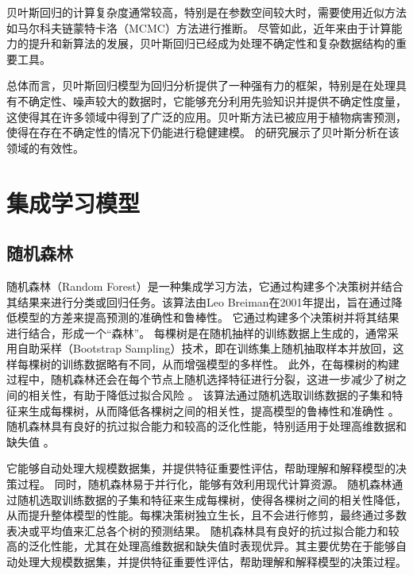 \documentclass[AutoFakeBold]{LZUThesis-PgD&PhD}
\begin{document}
	
	贝叶斯回归的计算复杂度通常较高，特别是在参数空间较大时，需要使用近似方法如马尔科夫链蒙特卡洛（MCMC）方法进行推断。
	尽管如此，近年来由于计算能力的提升和新算法的发展，贝叶斯回归已经成为处理不确定性和复杂数据结构的重要工具。
	
	总体而言，贝叶斯回归模型为回归分析提供了一种强有力的框架，特别是在处理具有不确定性、噪声较大的数据时，它能够充分利用先验知识并提供不确定性度量，这使得其在许多领域中得到了广泛的应用。贝叶斯方法已被应用于植物病害预测，使得在存在不确定性的情况下仍能进行稳健建模。\citet{yuen2002bayesian} 的研究展示了贝叶斯分析在该领域的有效性。
	
	\section{集成学习模型}
	
	\subsection{随机森林}
	
	随机森林（Random Forest）是一种集成学习方法，它通过构建多个决策树并结合其结果来进行分类或回归任务。该算法由Leo Breiman在2001年提出，旨在通过降低模型的方差来提高预测的准确性和鲁棒性。
	它通过构建多个决策树并将其结果进行结合，形成一个“森林”。
	每棵树是在随机抽样的训练数据上生成的，通常采用自助采样（Bootstrap Sampling）技术，即在训练集上随机抽取样本并放回，这样每棵树的训练数据略有不同，从而增强模型的多样性。
	此外，在每棵树的构建过程中，随机森林还会在每个节点上随机选择特征进行分裂，这进一步减少了树之间的相关性，有助于降低过拟合风险 \cite{breiman2001random}。
	该算法通过随机选取训练数据的子集和特征来生成每棵树，从而降低各棵树之间的相关性，提高模型的鲁棒性和准确性 \cite{liaw2002random}。
	随机森林具有良好的抗过拟合能力和较高的泛化性能，特别适用于处理高维数据和缺失值 \cite{ishwaran2008random}。

	它能够自动处理大规模数据集，并提供特征重要性评估，帮助理解和解释模型的决策过程。
	同时，随机森林易于并行化，能够有效利用现代计算资源。
	随机森林通过随机选取训练数据的子集和特征来生成每棵树，使得各棵树之间的相关性降低，从而提升整体模型的性能。每棵决策树独立生长，且不会进行修剪，最终通过多数表决或平均值来汇总各个树的预测结果。
	随机森林具有良好的抗过拟合能力和较高的泛化性能，尤其在处理高维数据和缺失值时表现优异。其主要优势在于能够自动处理大规模数据集，并提供特征重要性评估，帮助理解和解释模型的决策过程。
	
\end{document}
